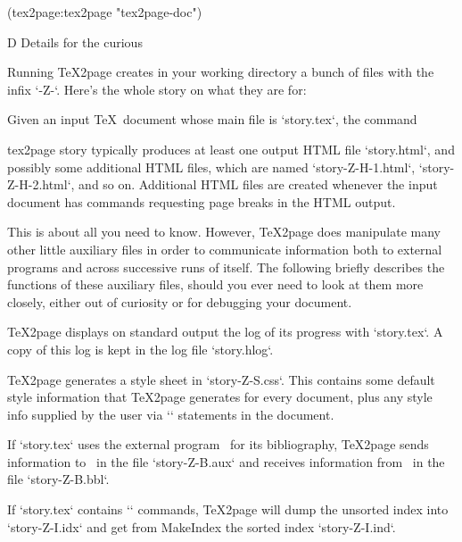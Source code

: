 \begintts
(tex2page:tex2page "tex2page-doc")
\endtt

%
%
\fi


\beginchapter D Details for the curious

%
Running \TeX2page creates in your working directory  a bunch of files
with the infix `-Z-`. 
Here’s the whole story on what they are for:

Given an input \TeX\ document whose main file is
`story.tex`, the
command

\begintt
tex2page story
\endtt
%
typically produces at least one
output HTML file `story.html`, and possibly some
additional HTML files, which are named
`story-Z-H-1.html`, `story-Z-H-2.html`, and
so on.  Additional HTML files are created whenever the
input document has commands requesting page
breaks in the HTML output.

This is about all you need to know.  However, \TeX2page
does manipulate many other little auxiliary files in order to
communicate information both to external programs and
across successive runs of itself.  The following
briefly describes the functions of these auxiliary
files, should you ever need to look at them more
closely, either out of curiosity or for debugging your
document.

\TeX2page displays on standard output the log of
its progress with `story.tex`.  A copy of this
log is kept in the log
file `story.hlog`.

\TeX2page generates a style sheet in
`story-Z-S.css`.  This contains some default style
information that \TeX2page generates for every document,
plus any style info supplied by the user via
`\cssblock` statements in the document.


If `story.tex` uses the external program \BibTeX\ for
its bibliography, \TeX2page sends information to \BibTeX\
in the file `story-Z-B.aux` and receives information
from \BibTeX\ in the file `story-Z-B.bbl`.


If `story.tex` contains `\index` commands, \TeX2page
will dump the unsorted index into `story-Z-I.idx` and
get from MakeIndex the sorted index `story-Z-I.ind`.


